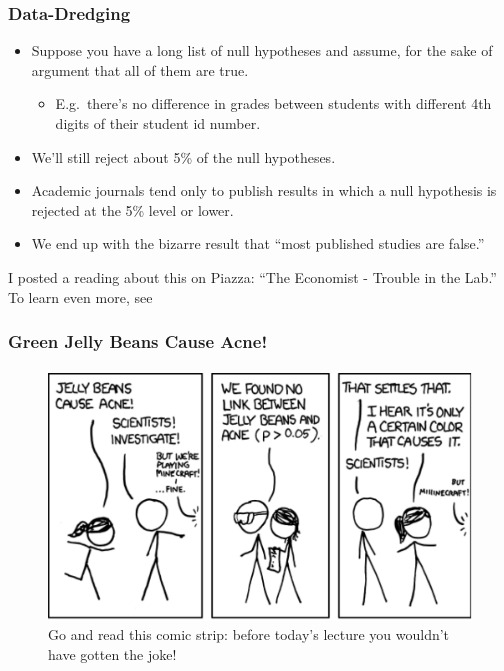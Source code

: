 \documentclass[handout]{beamer}
\begin{document}
\begin{frame}
\frametitle{Data-Dredging}
\begin{itemize}
	\item Suppose you have a long list of null hypotheses and assume, for the sake of argument that all of them are true.
		\begin{itemize}
			\item E.g.\ there's no difference in grades between students with different 4th digits of their student id number. 
		\end{itemize}
	\item We'll still reject about 5\% of the null hypotheses.
	\item Academic journals tend only to publish results in which a null hypothesis is rejected at the 5\% level or lower. 
	\item We end up with the bizarre result that ``most published studies are false.''  
\end{itemize}


\alert{I posted a reading about this on Piazza: ``The Economist - Trouble in the Lab.'' To learn even more, see \href{http://www.plosmedicine.org/article/info:doi/10.1371/journal.pmed.0020124}{\textcolor{blue}{}}}


\end{frame}
\begin{frame}
\frametitle{Green Jelly Beans Cause Acne!}
\framesubtitle{\href{http://xkcd.com/882/}{}}
\begin{figure}
\centering
	\includegraphics[scale=0.45]{./images/xkcd1}
	\caption{Go and read this comic strip: before today's lecture you wouldn't have gotten the joke!}
\end{figure}
\end{frame}
\end{document}
